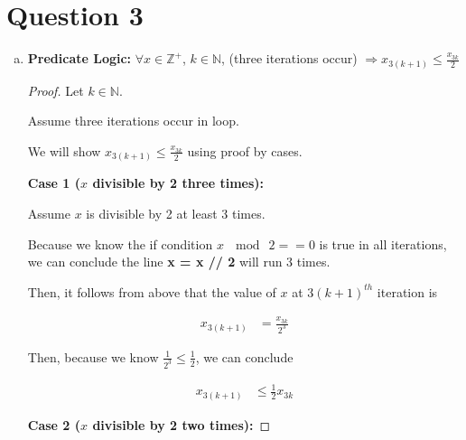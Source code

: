 \documentclass[12pt]{article}
\begin{document}
\section*{Question 3}
\begin{enumerate}[a.]
    \item

    \textbf{Predicate Logic:} $\forall x \in \mathbb{Z}^{+}$, $k \in \mathbb{N}$,
    (three iterations occur) $\Rightarrow x_{3(k+1)} \leq \displaystyle\frac{x_{3k}}{2}$

    \bigskip

    \begin{proof}

        Let $k \in \mathbb{N}$.

        \bigskip

        Assume three iterations occur in loop.

        \bigskip

        We will show $x_{3(k+1)} \leq \displaystyle\frac{x_{3k}}{2}$ using proof by cases.

        \bigskip

        \textbf{Case 1 ($x$ divisible by 2 three times):}

        \bigskip

        Assume $x$ is divisible by 2 at least 3 times.

        \bigskip

        Because we know the if condition $x\:\mod\:2 == 0$ is true in all iterations,
        we can conclude the line \textbf{x = x // 2} will run 3 times.

        \bigskip

        Then, it follows from above that the value of $x$ at $3(k+1)^{th}$ iteration
        is

        \begin{align}
            x_{3(k+1)} &= \frac{x_{3k}}{2^3}
        \end{align}

        \bigskip

        Then, because we know $\frac{1}{2^3} \leq \frac{1}{2}$, we can conclude

        \begin{align}
            x_{3(k+1)} &\leq \frac{1}{2} x_{3k}
        \end{align}

        \bigskip

        \textbf{Case 2 ($x$ divisible by 2 two times):}


\end{proof}
\end{enumerate}
\end{document}
